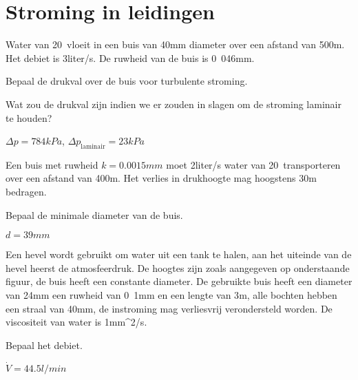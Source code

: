 \FloatBarrier
\chapter{Stroming in leidingen}
\label{sec:Stroming in leidingen}
\begin{toepassing}
	\label{buis}
	Water van 20\textcelsius\ vloeit in een buis van \unit{40}{mm} diameter over een afstand van \unit{500}{m}. Het debiet is \unit{3}{liter/s}.  De ruwheid van de buis is \unit{0.046}{mm}.
		
	Bepaal de drukval over de buis voor turbulente stroming.
		
	Wat zou de drukval zijn indien we er zouden in slagen om de stroming laminair te houden?
\end{toepassing}
\begin{antwoord}
	$\Delta p = \unit{784}{kPa}$, $\Delta p_{\text{laminair}} = \unit{23}{kPa}$
\end{antwoord}
\begin{toepassing}
	\label{buisdiameter}
	Een buis met ruwheid $k = \unit{0.0015}{mm}$ moet \unit{2}{liter/s} water van 20\textcelsius\ transporteren over een afstand van \unit{400}{m}.  Het verlies in drukhoogte mag hoogstens \unit{30}{m} bedragen.
		
	Bepaal de minimale diameter van de buis.
\end{toepassing}
\begin{antwoord}
	$d = \unit{39}{mm}$
\end{antwoord}
\begin{toepassing}
	\label{hevel met verlies}
	Een hevel wordt gebruikt om water uit een tank te halen, aan het uiteinde van de hevel heerst de atmosfeerdruk. De hoogtes zijn zoals aangegeven op onderstaande figuur, de buis heeft een constante diameter. De gebruikte buis heeft een diameter van \unit{24}{mm} een ruwheid van \unit{0.1}{mm} en een lengte van \unit{3}{m}, alle bochten hebben een straal van \unit{40}{mm}, de instroming mag verliesvrij verondersteld worden. De viscositeit van water is \unit{1}{mm^2/s}.
		
	Bepaal het debiet.
	\begin{center}
		
	\end{center}
\end{toepassing}
\begin{antwoord}
	$\dot{V} = \unit{44.5}{l/min}$
\end{antwoord}
